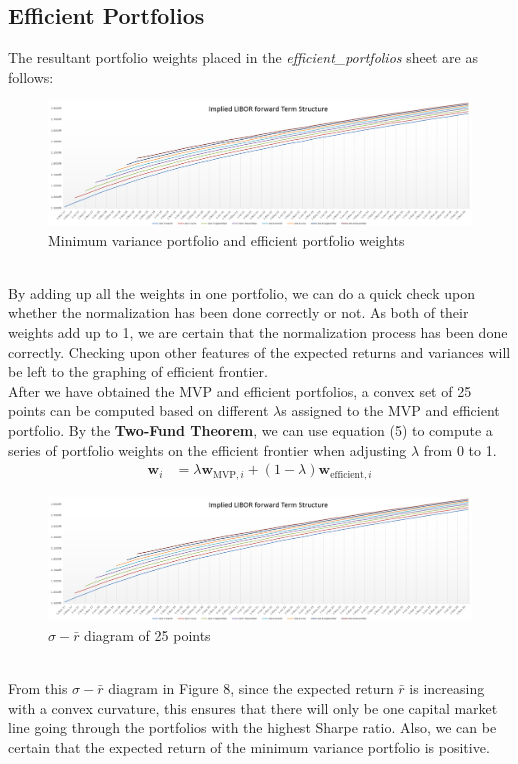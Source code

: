 \subsection{Efficient Portfolios}
The resultant portfolio weights placed in the \emph{efficient\_portfolios} sheet are as follows:
\begin{figure}[h]
	\centering
	\includegraphics[scale=0.5]{biu.PNG}
	\caption{Minimum variance portfolio and efficient portfolio weights}
\end{figure}
\\[6mm]By adding up all the weights in one portfolio, we can do a quick check upon whether the normalization has been done correctly or not. As both of their weights add up to 1, we are certain that the normalization process has been done correctly. Checking upon other features of the expected returns and variances will be left to the graphing of efficient frontier.\\
After we have obtained the MVP and efficient portfolios, a convex set of 25 points can be computed based on different $\lambda$s assigned to the MVP and efficient portfolio. By the \textbf{Two-Fund Theorem}, we can use equation (5) to compute a series of portfolio weights on the efficient frontier when adjusting $\lambda$ from 0 to 1.
\begin{equation}
\begin{split}
\textbf{w}_{i} &= \lambda \textbf{w}_{\text{MVP}, i} + (1 - \lambda) \textbf{w}_{\text{efficient}, i}
\end{split}
\end{equation}
\begin{figure}[h]
	\centering
	\includegraphics[scale=0.5]{biu.PNG}
	\caption{$\sigma-\bar{r}$ diagram of 25 points}
\end{figure}
\\From this $\sigma-\bar{r}$ diagram in Figure 8, since the expected return $\bar{r}$ is increasing with a convex curvature, this ensures that there will only be one capital market line going through the portfolios with the highest Sharpe ratio. Also, we can be certain that the expected return of the minimum variance portfolio is positive.
\newpage

